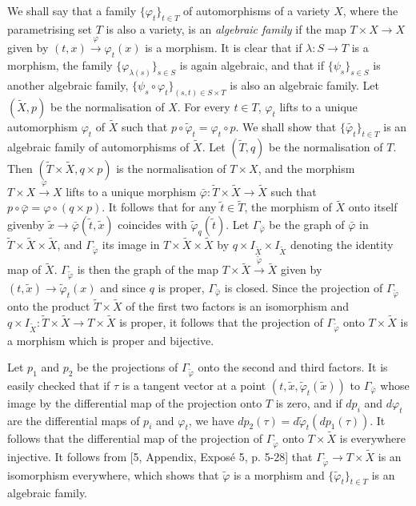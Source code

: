 We shall say that a family $\{\varphi_t\}_{t\in T}$ of automorphisms of a variety $X$, where the parametrising set $T$ is also a variety, is an {\em algebraic family } if the map $T \times X \to X$ given by $(t,x) \xrightarrow{\varphi} \varphi_t (x)$ is a morphism. It is clear that if $\lambda : S \to T$ is a morphism, the family $\{\varphi_{\lambda(s)} \}_{s\in S}$ is again algebraic, and that if $\{\psi_s\}_{s \in S}$ is another algebraic family, $\{\psi_s \circ \varphi_t \}_{(s,t) \in S \times T}$ is also an algebraic family. Let $(\tilde{X},p)$ be the normalisation of $X$. For every $t \in T$, $\varphi_t$ lifts to a unique automorphism $\varphi_t$ of $\tilde{X}$ such that $p \circ \tilde{\varphi}_t = \varphi_t \circ p$. We shall show that $\{\tilde{\varphi_t} \}_{t \in T}$ is an algebraic family of automorphisms of $\tilde{X}$. Let $(\tilde{T}, q)$ be the normalisation of $T$. Then $(\tilde{T} \times \tilde{X}, q \times p)$ is the normalisation of $T \times X$, and the morphism $T \times X \xrightarrow{\varphi} X$ lifts to a unique morphism $\bar{\varphi}: \tilde{T} \times \tilde{X} \to \tilde{X}$ such that $p\circ \bar{\varphi} = \varphi \circ (q \times p)$. It follows that for any $\tilde{t} \in \tilde{T}$, the morphism of $\tilde{X}$ onto itself given\pageoriginale by $\tilde{x} \to \bar{\varphi} (\tilde{t}, \tilde{x})$ coincides with $\tilde{\varphi}_q (\tilde{t})$. Let $\Gamma_{\bar{\varphi}}$ be the graph of $\bar{\varphi}$ in $\tilde{T} \times \tilde{X} \times \tilde{X}$, and 
$\Gamma_{\tilde{\varphi}}$ its image in $T \times \tilde{X} \times \tilde{X}$ by $q \times I_{\tilde{X}} \times I_{\tilde{X}}$ denoting the identity map of $\tilde{X}$. $\Gamma_{\tilde{\varphi}}$ is then the graph of the map $T \times \tilde{X} \xrightarrow{\tilde{\varphi}} \tilde{X}$ given by $(t, \tilde{x}) \to \tilde{\varphi}_t (x)$ and since $q$ is proper, $\Gamma_{\bar{\varphi}}$ is closed. Since the projection of $\Gamma_{\tilde{\varphi}}$ onto the product $\tilde{T} \times \tilde{X}$ of the first two factors is an isomorphism and $q \times  I_{\tilde{X}}: \tilde{T} \times \tilde{X} \to T \times \tilde{X}$ is proper, it follows that the projection of $\Gamma_{\tilde{\varphi}}$ onto $T \times \tilde{X}$ is a morphism which is proper and bijective.

Let $p_1$ and $p_2$ be the projections of $\Gamma_{\tilde{\varphi}}$ onto the second and third factors. It is easily checked that if $\tau$ is a tangent vector at a point $(t, \tilde{x}, \tilde{\varphi}_t (\tilde{x}))$ to $\Gamma_{\bar{\varphi}}$ whose image by the differential map of the projection onto $T$ is zero, and if $dp_i$ and $d\varphi_t$ are the differential maps of $p_i$ and $\varphi_t$, we have $dp_2 (\tau) =d\tilde{\varphi}_t (d p_1 (\tau))$. It follows that the differential map of the projection of $\Gamma_{\tilde{\varphi}}$ onto $T\times\tilde{X}$ is everywhere injective. It follows from [5, Appendix, Expos\'e 5, p. 5-28] that $\Gamma_{\tilde{\varphi}} \to T \times \tilde{X}$ is an isomorphism everywhere, which shows that $\tilde{\varphi}$ is a morphism and $\{ \tilde{\varphi}_t\}_{t \in T}$ is an algebraic family.

